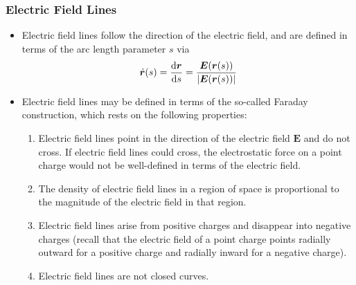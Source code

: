 \documentclass[11pt, a4paper]{article}
\renewcommand{\vec}[1]{\bm{#1}} %
\renewcommand{\r}{\vec{r}}
\newcommand{\E}{\vec{E}} %
\begin{document}
\subsubsection{Electric Field Lines}
\begin{itemize}
    \item Electric field lines follow the direction of the electric field, and are defined in terms of the arc length parameter $ s $ via
    \begin{equation*}
        \dot{\vec{r}}(s) = \dv{\r}{s} = \frac{\E(\r(s))}{\abs{\E(\r(s))}}
    \end{equation*}

    \item Electric field lines may be defined in terms of the so-called Faraday construction, which rests on the following properties:
    \begin{enumerate}
        \item Electric field lines point in the direction of the electric field $ \E $ and do not cross. If electric field lines could cross, the electrostatic force on a point charge would not be well-defined in terms of the electric field.

        \item The density of electric field lines in a region of space is proportional to the magnitude of the electric field in that region. 

        \item Electric field lines arise from positive charges and disappear into negative charges (recall that the electric field of a point charge points radially outward for a positive charge and radially inward for a negative charge).

        \item Electric field lines are not closed curves.
    \end{enumerate}
\end{itemize}
\end{document}
